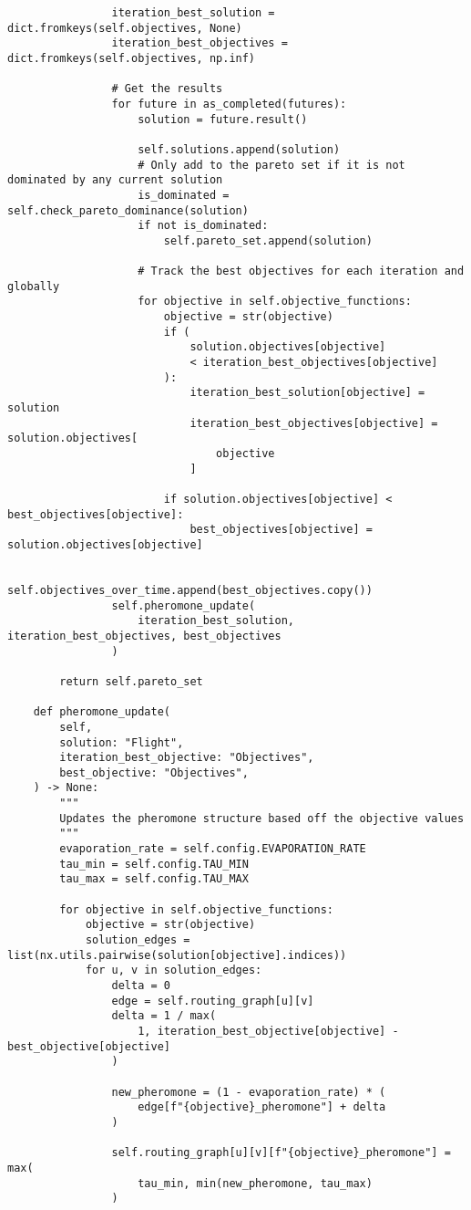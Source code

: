 \begin{verbatim}
                iteration_best_solution = dict.fromkeys(self.objectives, None)
                iteration_best_objectives = dict.fromkeys(self.objectives, np.inf)

                # Get the results
                for future in as_completed(futures):
                    solution = future.result()

                    self.solutions.append(solution)
                    # Only add to the pareto set if it is not dominated by any current solution
                    is_dominated = self.check_pareto_dominance(solution)
                    if not is_dominated:
                        self.pareto_set.append(solution)

                    # Track the best objectives for each iteration and globally
                    for objective in self.objective_functions:
                        objective = str(objective)
                        if (
                            solution.objectives[objective]
                            < iteration_best_objectives[objective]
                        ):
                            iteration_best_solution[objective] = solution
                            iteration_best_objectives[objective] = solution.objectives[
                                objective
                            ]

                        if solution.objectives[objective] < best_objectives[objective]:
                            best_objectives[objective] = solution.objectives[objective]

                self.objectives_over_time.append(best_objectives.copy())
                self.pheromone_update(
                    iteration_best_solution, iteration_best_objectives, best_objectives
                )

        return self.pareto_set

    def pheromone_update(
        self,
        solution: "Flight",
        iteration_best_objective: "Objectives",
        best_objective: "Objectives",
    ) -> None:
        """
        Updates the pheromone structure based off the objective values
        """
        evaporation_rate = self.config.EVAPORATION_RATE
        tau_min = self.config.TAU_MIN
        tau_max = self.config.TAU_MAX

        for objective in self.objective_functions:
            objective = str(objective)
            solution_edges = list(nx.utils.pairwise(solution[objective].indices))
            for u, v in solution_edges:
                delta = 0
                edge = self.routing_graph[u][v]
                delta = 1 / max(
                    1, iteration_best_objective[objective] - best_objective[objective]
                )

                new_pheromone = (1 - evaporation_rate) * (
                    edge[f"{objective}_pheromone"] + delta
                )

                self.routing_graph[u][v][f"{objective}_pheromone"] = max(
                    tau_min, min(new_pheromone, tau_max)
                )

\end{verbatim}
